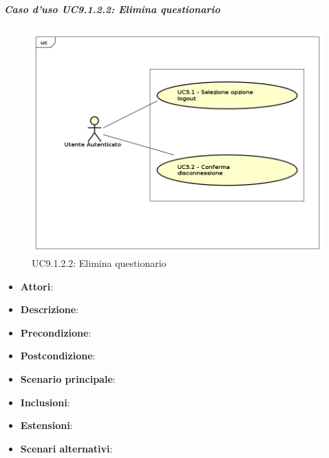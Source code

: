 			\subparagraph{Caso d'uso UC9.1.2.2: Elimina questionario}
			\label{UC9.1.2.2}
			\begin{figure}[h]
				\centering
			\includegraphics[scale=0.7,keepaspectratio]{UML/UC9.png}
				\caption{UC9.1.2.2: Elimina questionario}
			\end{figure}
			\FloatBarrier
			\begin{itemize}
				\item \textbf{Attori}: 
				\item \textbf{Descrizione}: 
				\item \textbf{Precondizione}: 
				\item \textbf{Postcondizione}: 
				\item \textbf{Scenario principale}:
				\item \textbf{Inclusioni}:
				\item \textbf{Estensioni}:
				\item \textbf{Scenari alternativi}:
			\end{itemize}
			
